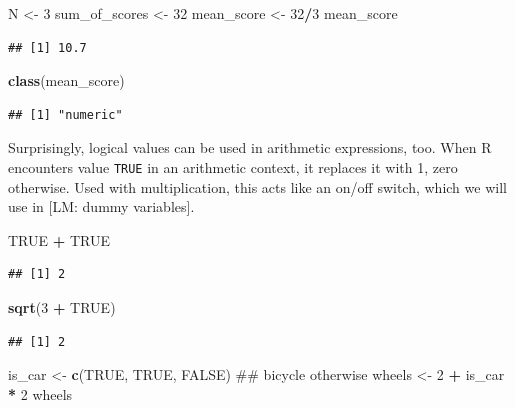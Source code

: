 \documentclass[]{svmono}
\newenvironment{Shaded}{\begin{snugshade}}{\end{snugshade}}
\newcommand{\KeywordTok}[1]{\textcolor[rgb]{0.13,0.29,0.53}{\textbf{#1}}}
\newcommand{\DecValTok}[1]{\textcolor[rgb]{0.00,0.00,0.81}{#1}}
\newcommand{\StringTok}[1]{\textcolor[rgb]{0.31,0.60,0.02}{#1}}
\newcommand{\OtherTok}[1]{\textcolor[rgb]{0.56,0.35,0.01}{#1}}
\newcommand{\OperatorTok}[1]{\textcolor[rgb]{0.81,0.36,0.00}{\textbf{#1}}}
\newcommand{\NormalTok}[1]{#1}
\theoremstyle{definition}
\theoremstyle{definition}
\theoremstyle{definition}
\theoremstyle{remark}
\begin{document}
\begin{Shaded}
\begin{Highlighting}[]
\NormalTok{N <-}\StringTok{ }\DecValTok{3}
\NormalTok{sum_of_scores <-}\StringTok{ }\DecValTok{32}
\NormalTok{mean_score <-}\StringTok{ }\DecValTok{32}\OperatorTok{/}\DecValTok{3}
\NormalTok{mean_score}
\end{Highlighting}
\end{Shaded}

\begin{verbatim}
## [1] 10.7
\end{verbatim}

\begin{Shaded}
\begin{Highlighting}[]
\KeywordTok{class}\NormalTok{(mean_score)}
\end{Highlighting}
\end{Shaded}

\begin{verbatim}
## [1] "numeric"
\end{verbatim}

Surprisingly, logical values can be used in arithmetic expressions, too.
When R encounters value \texttt{TRUE} in an arithmetic context, it
replaces it with 1, zero otherwise. Used with multiplication, this acts
like an on/off switch, which we will use in {[}LM: dummy variables{]}.

\begin{Shaded}
\begin{Highlighting}[]
\OtherTok{TRUE} \OperatorTok{+}\StringTok{ }\OtherTok{TRUE}
\end{Highlighting}
\end{Shaded}

\begin{verbatim}
## [1] 2
\end{verbatim}

\begin{Shaded}
\begin{Highlighting}[]
\KeywordTok{sqrt}\NormalTok{(}\DecValTok{3} \OperatorTok{+}\StringTok{ }\OtherTok{TRUE}\NormalTok{)}
\end{Highlighting}
\end{Shaded}

\begin{verbatim}
## [1] 2
\end{verbatim}

\begin{Shaded}
\begin{Highlighting}[]
\NormalTok{is_car <-}\StringTok{ }\KeywordTok{c}\NormalTok{(}\OtherTok{TRUE}\NormalTok{, }\OtherTok{TRUE}\NormalTok{, }\OtherTok{FALSE}\NormalTok{) ## bicycle otherwise}
\NormalTok{wheels <-}\StringTok{ }\DecValTok{2} \OperatorTok{+}\StringTok{ }\NormalTok{is_car }\OperatorTok{*}\StringTok{ }\DecValTok{2}
\NormalTok{wheels}
\end{Highlighting}
\end{Shaded}
\end{document}
